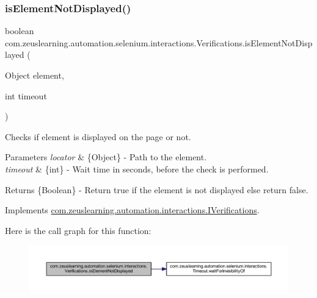 \subsubsection{\texorpdfstring{is\+Element\+Not\+Displayed()}{isElementNotDisplayed()}\hspace{0.1cm}{\footnotesize\ttfamily [2/2]}}
{\footnotesize\ttfamily boolean com.\+zeuslearning.\+automation.\+selenium.\+interactions.\+Verifications.\+is\+Element\+Not\+Displayed (\begin{DoxyParamCaption}\item[{Object}]{element,  }\item[{int}]{timeout }\end{DoxyParamCaption})\hspace{0.3cm}{\ttfamily [inline]}}

Checks if element is displayed on the page or not.


\begin{DoxyParams}{Parameters}
{\em locator} & \{Object\} -\/ Path to the element. \\
\hline
{\em timeout} & \{int\} -\/ Wait time in seconds, before the check is performed. \\
\hline
\end{DoxyParams}
\begin{DoxyReturn}{Returns}
\{Boolean\} -\/ Return {\ttfamily true} if the element is not displayed else return false. 
\end{DoxyReturn}


Implements \hyperlink{interfacecom_1_1zeuslearning_1_1automation_1_1interactions_1_1IVerifications_ae316099347aefe61a68670c2f5fedaea}{com.\+zeuslearning.\+automation.\+interactions.\+I\+Verifications}.

Here is the call graph for this function\+:
\nopagebreak
\begin{figure}[H]
\begin{center}
\leavevmode
\includegraphics[width=350pt]{d2/d6b/classcom_1_1zeuslearning_1_1automation_1_1selenium_1_1interactions_1_1Verifications_a5b51bdfb17dbfd284572253189f54fb4_cgraph}
\end{center}
\end{figure}
\hypertarget{classcom_1_1zeuslearning_1_1automation_1_1selenium_1_1interactions_1_1Verifications_a0624db14fc06201e55890b160331bde9}{}\label{classcom_1_1zeuslearning_1_1automation_1_1selenium_1_1interactions_1_1Verifications_a0624db14fc06201e55890b160331bde9} 
